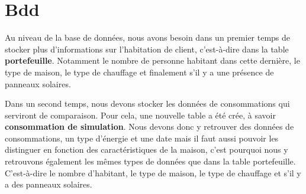 \section{Bdd}

\begin{flushleft}
Au niveau de la base de données, nous avons besoin dans un premier temps de stocker plus d'informations sur l'habitation de client, c'est-à-dire dans la table \textbf{portefeuille}. Notamment le nombre de personne habitant dans cette dernière, le type de maison, le type de chauffage et finalement s'il y a une présence de panneaux solaires.
\end{flushleft}

\begin{flushleft}
Dans un second temps, nous devons stocker les données de consommations qui serviront de comparaison. Pour cela, une nouvelle table a été crée, à savoir \textbf{consommation de simulation}. Nous devons donc y retrouver des données de consommations, un type d'énergie et une date mais il faut aussi pouvoir les distinguer en fonction des caractéristiques de la maison, c'est pourquoi nous y retrouvons également les mêmes types de données que dans la table portefeuille. C'est-à-dire le nombre d'habitant, le type de maison, le type de chauffage et s'il y a des panneaux solaires.
\end{flushleft}
